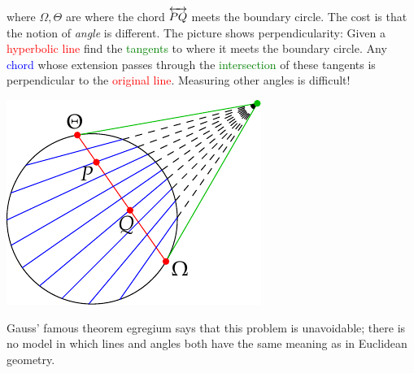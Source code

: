 \begin{minipage}[t]{0.69\linewidth}\vspace{0pt}
where $\Omega,\Theta$ are where the chord $\smash[t]{\overleftrightarrow{PQ}}$ meets the boundary circle.\smallbreak
The cost is that the notion of \emph{angle} is different. The picture shows perpendicularity: Given a \textcolor{red}{hyperbolic line} find the \textcolor{Green}{tangents} to where it meets the boundary circle. Any \textcolor{blue}{chord} whose extension passes through the \textcolor{Green}{intersection} of these tangents is perpendicular to the \textcolor{red}{original line}. Measuring other angles is difficult!
\end{minipage}
\begin{minipage}[t]{0.3\linewidth}\vspace{-32pt}
\flushright\includegraphics[scale=0.9]{models-klein}
\end{minipage}\medbreak

Gauss' famous theorem egregium says that this problem is unavoidable; there is no model in which lines and angles both have the same meaning as in Euclidean geometry. 


